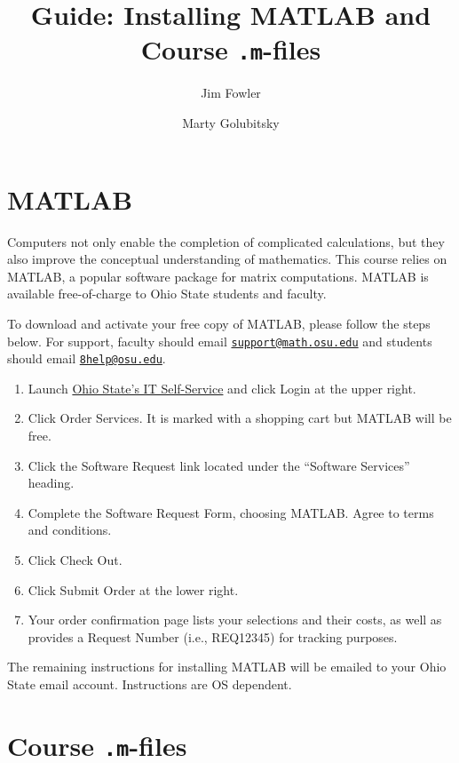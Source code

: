 \documentclass{article}
\title{Guide: Installing MATLAB and Course \texttt{.m}-files}
\author{Jim Fowler \and Marty Golubitsky}
\begin{document}
\maketitle

\section{MATLAB}\label{for-ohio-state-faculty-and-students}

Computers not only enable the completion of complicated calculations,
but they also improve the conceptual understanding of
mathematics. This course relies on MATLAB, a popular software package
for matrix computations. MATLAB is available free-of-charge to Ohio
State students and faculty.

To download and activate your free copy of MATLAB, please follow the
steps below.  For support, faculty should email
\href{mailto:support@math.osu.edu}{\texttt{support@math.osu.edu}} and
students should email
\href{mailto:8help@osu.edu}{\texttt{8help@osu.edu}}.

\begin{enumerate}
\def\labelenumi{\arabic{enumi})}
\item Launch \href{https://osuitsm.service-now.com/selfservice/}{Ohio
    State's IT Self-Service} and click Login at the upper right.
\item Click Order Services. It is marked with a shopping cart but
  MATLAB will be free.
\item Click the Software Request link located under the ``Software
  Services'' heading.
\item Complete the Software Request Form, choosing MATLAB. Agree to
  terms and conditions.
\item Click Check Out.
\item Click Submit Order at the lower right.
\item Your order confirmation page lists your selections and their
  costs, as well as provides a Request Number (i.e., REQ12345) for
  tracking purposes.
\end{enumerate}

The remaining instructions for installing MATLAB will be emailed to
your Ohio State email account. Instructions are OS dependent.

\section{Course \texttt{.m}-files}
\end{document}
